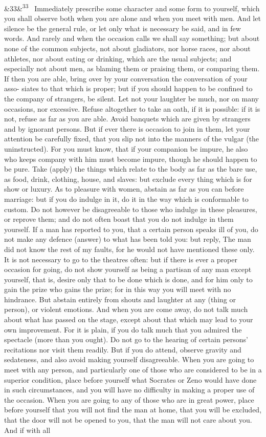 \documentclass[12pt]{article}
\newcommand{\para}[1][]{\par\noindent\ifx&#1&\else\textsuperscript{\footnotesize #1}~\fi}
\begin{document}
\para[33] Immediately prescribe some character and some form to yourself, which you shall observe both when you are alone and when you meet with men. And let silence be the general rule, or let only what is necessary be said, and in few words. And rarely and when the occasion calls we shall say something; but about none of the common subjects, not about gladiators, nor horse races, nor about athletes, nor about eating or drinking, which are the usual subjects; and especially not about men, as blaming them or praising them, or comparing them. If then you are able, bring over by your conversation the conversation of your asso- siates to that which is proper; but if you should happen to be confined to the company of strangers, be silent. Let not your laughter be much, nor on many occasions, nor excessive. Refuse altogether to take an oath, if it is possible: if it is not, refuse as far as you are able. Avoid banquets which are given by strangers and by ignorant persons. But if ever there is occasion to join in them, let your attention be carefully fixed, that you slip not into the manners of the vulgar (the uninstructed). For you must know, that if your companion be impure, he also who keeps company with him must become impure, though he should happen to be pure. Take (apply) the things which relate to the body as far as the bare use, as food, drink, clothing, house, and slaves: but exclude every thing which is for show or luxury. As to pleasure with women, abstain as far as you can before marriage: but if you do indulge in it, do it in the way which is conformable to custom. Do not however be disagreeable to those who indulge in these pleasures, or reprove them; and do not often boast that you do not indulge in them yourself. If a man has reported to you, that a certain person speaks ill of you, do not make any defence (answer) to what has been told you: but reply, The man did not know the rest of my faults, for he would not have mentioned these only. It is not necessary to go to the theatres often: but if there is ever a proper occasion for going, do not show yourself as being a partisan of any man except yourself, that is, desire only that to be done which is done, and for him only to gain the prize who gains the prize; for in this way you will meet with no hindrance. But abstain entirely from shouts and laughter at any (thing or person), or violent emotions. And when you are come away, do not talk much about what has passed on the stage, except about that which may lead to your own improvement. For it is plain, if you do talk much that you admired the spectacle (more than you ought). Do not go to the hearing of certain persons' recitations nor visit them readily. But if you do attend, observe gravity and sedateness, and also avoid making yourself disagreeable. When you are going to meet with any person, and particularly one of those who are considered to be in a superior condition, place before yourself what Socrates or Zeno would have done in such circumstances, and you will have no difficulty in making a proper use of the occasion. When you are going to any of those who are in great power, place before yourself that you will not find the man at home, that you will be excluded, that the door will not be opened to you, that the man will not care about you. And if with all 
\end{document}
